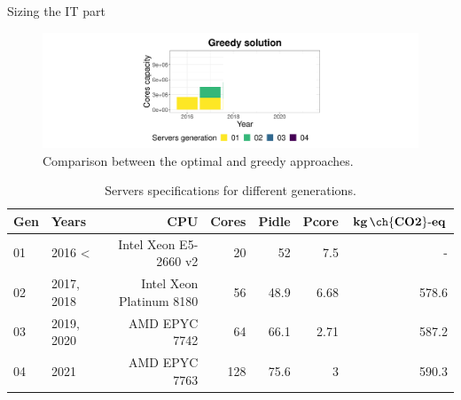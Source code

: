 \documentclass[Ligatures=TeX,table,svgnames,usetotalslideindicator,compress,10pt,aspectratio=169]{beamer}
\begin{document}
\begin{frame}{Sizing the IT part}
  \begin{center}
    \begin{figure}[h]    
      \centering
      \includegraphics[width=.9\textwidth]{images/cloud_federation_evolution_lifetime_year2.png}
      \caption{Comparison between the optimal and greedy approaches.}
    \end{figure}    
  \end{center}  

  \begin{table}[h]
  \tiny
  \label{tab:servers_specs} 
  \caption{Servers specifications for different generations.} \centering
  \begin{tabular}{|l|l|r|r|r|r|r|}
  \hline    
  \textbf{Gen} & \textbf{Years} & \textbf{CPU} &   \textbf{Cores} & \textbf{Pidle}  & \textbf{Pcore}  & \textbf{$\mathbf{kg\,\ch{CO2}\text{-}eq}$}  \\
  \hline
  01      &  2016 < & Intel Xeon E5-2660 v2 & 20 & 52 & 7.5  & -   \\
  \hline
  02 & 2017, 2018 & Intel Xeon Platinum 8180 & 56 & 48.9 & 6.68  & 578.6   \\
  \hline
  03   & 2019, 2020 & AMD EPYC 7742  & 64 & 66.1 & 2.71  & 587.2 \\
  \hline
  04   & 2021      & AMD EPYC 7763 & 128 & 75.6 & 3     & 590.3 \\
  \hline
  
\end{tabular}  
\end{table}

\end{frame}
\addtocounter{framenumber}{-1}
\end{document}
